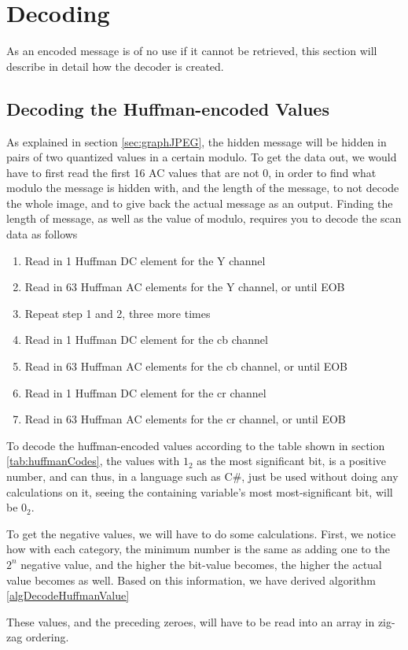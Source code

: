 \section{Decoding}
As an encoded message is of no use if it cannot be retrieved, this section will describe in detail how the decoder is created.



\subsection{Decoding the Huffman-encoded Values}
As explained in section \ref{sec:graphJPEG}, the hidden message will be hidden in pairs of two quantized values in a certain modulo.
To get the data out, we would have to first read the first 16 AC values that are not 0, in order to find what modulo the message is hidden with, and the length of the message, to not decode the whole image, and to give back the actual message as an output.
Finding the length of message, as well as the value of modulo, requires you to decode the scan data as follows
\begin{enumerate}
	\item Read in 1 Huffman DC element for the Y channel
	\item Read in 63 Huffman AC elements for the Y channel, or until EOB
	\item Repeat step 1 and 2, three more times
	\item Read in 1 Huffman DC element for the cb channel
	\item Read in 63 Huffman AC elements for the cb channel, or until EOB
	\item Read in 1 Huffman DC element for the cr channel
	\item Read in 63 Huffman AC elements for the cr channel, or until EOB
\end{enumerate}
To decode the huffman-encoded values according to the table shown in section \ref{tab:huffmanCodes}, the values with $1_2$ as the most significant bit, is a positive number, and can thus, in a language such as C\#, just be used without doing any calculations on it, seeing the containing variable's most most-significant bit, will be $0_2$.

To get the negative values, we will have to do some calculations. 
First, we notice how with each category, the minimum number is the same as adding one to the $2^n$ negative value, and the higher the bit-value becomes, the higher the actual value becomes as well. 
Based on this information, we have derived algorithm \ref{algDecodeHuffmanValue}

These values, and the preceding zeroes, will have to be read into an array in zig-zag ordering.

